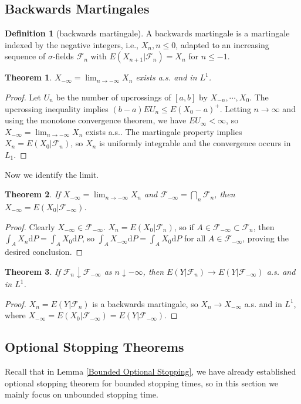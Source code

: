 \documentclass{article}
\newtheorem{Thm}{Theorem}[section]
\theoremstyle{definition}
\newtheorem{Def}{Definition}[section]
\begin{document}
\subsection{Backwards Martingales}
\begin{Def}[backwards martingale]
A backwards martingale is a martingale indexed by the negative integers, i.e., $X_n,n\le 0$, adapted to an increasing sequence of $\sigma$-fields $\mathcal{F}_n$ with $E(X_{n+1}|\mathcal{F}_n)=X_n$ for $n\le -1$.
\end{Def}
\begin{Thm}
$X_{-\infty}=\lim_{n\to-\infty}X_n$ exists a.s. and in $L^1$.
\end{Thm}
\begin{proof}
 Let $U_n$ be the number of upcrossings of $[a,b]$ by $X_{-n},\cdots,X_0$.
 The upcrossing inequality implies $(b-a)EU_n\le E(X_0-a)^+$. Letting $n\to\infty$ and using the monotone convergence theorem,
 we have $EU_\infty<\infty$, so $X_{-\infty}=\lim_{n\to-\infty}X_n$ exists a.s..\newline 
 The martingale property implies $X_n=E(X_0|\mathcal{F}_n)$, so $X_n$ is uniformly integrable and the convergence occurs in $L_1$.

\end{proof}
Now we identify the limit.
\begin{Thm}
If $X_{-\infty}=\lim_{n\to-\infty}X_n$ and $\mathcal{F}_{-\infty}=\bigcap_n\mathcal{F}_n$, then $X_{-\infty}=E(X_0|\mathcal{F}_{-\infty})$.
\end{Thm}
\begin{proof}
Clearly $X_{-\infty}\in\mathcal{F}_{-\infty}$. $X_n=E(X_0|\mathcal{F}_n)$, so if $A\in\mathcal{F}_{-\infty}\subset\mathcal{F}_n$, then $\int_AX_n\mathrm{d}P=\int_AX_0\mathrm{d}P$, so $\int_AX_{-\infty}\mathrm{d}P=\int_AX_0\mathrm{d}P$ for all $A\in\mathcal{F}_{-\infty}$, proving the desired conclusion.
\end{proof}
\begin{Thm}
If $\mathcal{F}_n\downarrow\mathcal{F}_{-\infty}$ as $n\downarrow -\infty$, then $E(Y|\mathcal{F}_n)\to E(Y|\mathcal{F}_{-\infty})$ a.s. and in $L^1$.
\end{Thm}
\begin{proof}
$X_n=E(Y|\mathcal{F}_n)$ is a backwards martingale, so $X_n\to X_{-\infty}$ a.s. and in $L^1$, where $X_{-\infty}=E(X_0|\mathcal{F}_{-\infty})=E(Y|\mathcal{F}_{-\infty})$.
\end{proof}

\subsection{Optional Stopping Theorems}
Recall that in Lemma \ref{Bounded Optional Stopping}, we have already established optional stopping theorem for bounded stopping times,
so in this section we mainly focus on unbounded stopping time. 
\end{document}
